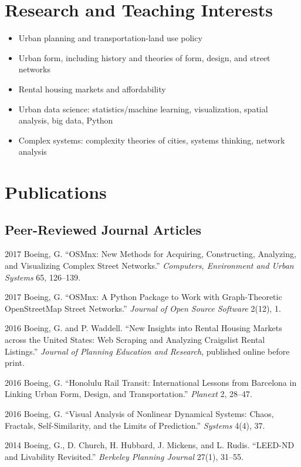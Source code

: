 \documentclass{academiccv}
\begin{document}
\section*{Research and Teaching Interests}

\begin{itemize}
\item Urban planning and transportation-land use policy
\item Urban form, including history and theories of form, design, and street networks
\item Rental housing markets and affordability
\item Urban data science: statistics/machine learning, visualization, spatial analysis, big data, Python
\item Complex systems: complexity theories of cities, systems thinking, network analysis
\end{itemize}



\section*{Publications}

\subsection*{Peer-Reviewed Journal Articles}

\begin{tablist}

\item[2017] \tab Boeing, G. \enquote{OSMnx: New Methods for Acquiring, Constructing, Analyzing, and Visualizing Complex Street Networks.} \emph{Computers, Environment and Urban Systems} 65, 126--139.

\item[2017] \tab Boeing, G. \enquote{OSMnx: A Python Package to Work with Graph-Theoretic OpenStreetMap Street Networks.} \emph{Journal of Open Source Software} 2(12), 1.

\item[2016] \tab Boeing, G. and P. Waddell. \enquote{New Insights into Rental Housing Markets across the United States: Web Scraping and Analyzing Craigslist Rental Listings.} \emph{Journal of Planning Education and Research}, published online before print.

\item[2016] \tab Boeing, G. \enquote{Honolulu Rail Transit: International Lessons from Barcelona in Linking Urban Form, Design, and Transportation.} \emph{Planext} 2, 28--47.

\item[2016] \tab Boeing, G. \enquote{Visual Analysis of Nonlinear Dynamical Systems: Chaos, Fractals, Self-Similarity, and the Limits of Prediction.} \emph{Systems} 4(4), 37.

\item[2014] \tab Boeing, G., D. Church, H. Hubbard, J. Mickens, and L. Rudis. \enquote{LEED-ND and Livability Revisited.} \emph{Berkeley Planning Journal} 27(1), 31--55.

\end{tablist}
\end{document}
